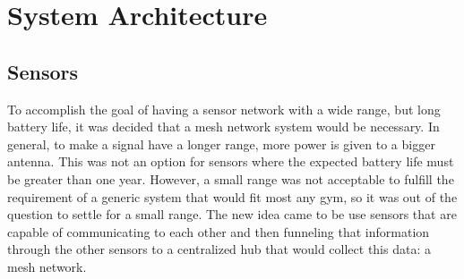 \documentclass[PPFS.tex]{template/subfiles}
\begin{document}
\begin{comment}
    ----- Problem Statement -----
    It is helpful to provide a very simple block diagram of your project very early in the report to provide a
    graphical view that helps the reader understand. This diagram should focus on the interface(s) to your
    project. You may even show your project as a single block. This diagram can be more stylized (perhaps
    with clip art) to get the main idea across to the reader.

    When you get to sections that explain your design process, start with the design of the system
    architecture. This is where you provide a detailed block diagram of your system. Be sure to justify your
    approach. Why did you break down the functionality of the system into the blocks as you did? Were
    there alternative ways to do it?

    In many cases, you may also include a block diagram of the hardware and a separate block diagram of the
    software (and perhaps a system block diagram to show how the two relate). Many teams make the
    mistake of describing the software with very little detail. It is highly recommended that you include a
    block diagram of your software, preferably using the Uniform Modeling Language (UML).
\end{comment}

\section{System Architecture}


\subsection{Sensors}

To accomplish the goal of having a sensor network with a wide range, but long battery life, it was decided that a mesh network system would be necessary. In general, to make a signal have a longer range, more power is given to a bigger antenna. This was not an option for sensors where the expected battery life must be greater than one year. However, a small range was not acceptable to fulfill the requirement of a generic system that would fit most any gym, so it was out of the question to settle for a small range. The new idea came to be use sensors that are capable of communicating to each other and then funneling that information through the other sensors to a centralized hub that would collect this data: a mesh network.
\end{document}
